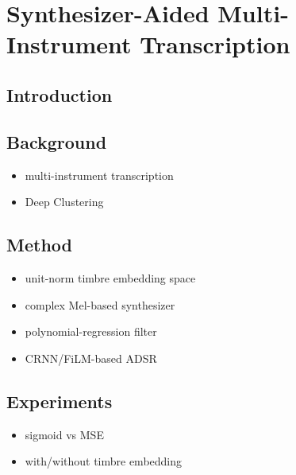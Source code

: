 
\graphicspath{{7-timbre/figures/}}

\chapter{Synthesizer-Aided Multi-Instrument Transcription}
\label{ch:timbre}

\section{Introduction}

\section{Background}

\begin{itemize}
	\item multi-instrument transcription
	\item Deep Clustering
\end{itemize}

\section{Method}

\begin{itemize}
	\item unit-norm timbre embedding space
	\item complex Mel-based synthesizer
	\item polynomial-regression filter
	\item CRNN/FiLM-based ADSR
\end{itemize}

\section{Experiments}

\begin{itemize}
	\item sigmoid vs MSE
	\item with/without timbre embedding
\end{itemize}